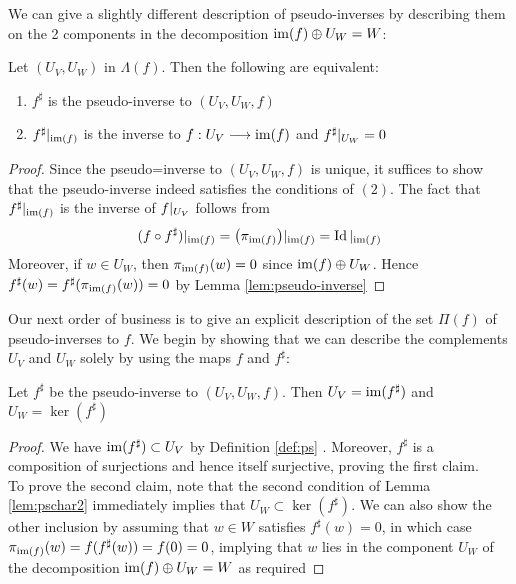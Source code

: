 We can give a slightly different description of pseudo-inverses by describing them on the 2 components in the decomposition $\operatorname{im}(f)\oplus U_W =W$:


\begin{lemma}\label{lem:pschar2}
Let $(U_V,U_W)$ in $\Lambda(f)$. Then the following are equivalent:
\begin{enumerate}
	\item $f^\sharp$ is the pseudo-inverse to $(U_V,U_W,f)$
	\item $f^\sharp\arrowvert_{\operatorname{im}(f)}$ is the inverse to $f:U_V\longrightarrow \operatorname{im}(f)$ and $f^\sharp\arrowvert_{U_W}=0$
\end{enumerate}

\end{lemma}

\begin{proof}
	Since the pseudo=inverse to $(U_V,U_W,f)$ is unique, it suffices to show that the pseudo-inverse indeed satisfies the conditions of $(2)$. The fact that $f^\sharp\arrowvert_{\operatorname{im}(f)}$ is the inverse of $f\arrowvert_{U_V}$ follows from 
	\[
	(f\circ f^\sharp) \arrowvert_{\operatorname{im}(f)}=\big(\pi_{\operatorname{im}(f)}\big)\arrowvert_{\operatorname{im}(f)}=\operatorname{Id}\arrowvert_{\operatorname{im}(f)}
\] 
Moreover, if $w \in U_W$, then $\pi_{\operatorname{im}(f)}(w)=0$ since $\operatorname{im}(f)\oplus U_W$. Hence $f^\sharp(w)=f^\sharp(\pi_{\operatorname{im}(f)}(w))=0$ by Lemma \ref{lem:pseudo-inverse}
\end{proof}
Our next order of business is to give an explicit description of the set $\Pi(f)$ of pseudo-inverses to $f$. We begin by showing that we can describe the complements $U_V$ and $U_W$ solely by using the maps $f$ and $f^\sharp$:
\begin{lemma}\label{lem:psim-ker}
	Let $f^\sharp$ be the pseudo-inverse to $(U_V,U_W,f)$. Then $U_V=\operatorname{im}(f^\sharp)$ and $U_W=\ker(f^\sharp)$
\end{lemma}

\begin{proof}
	We have $\operatorname{im}(f^\sharp)\subset U_V$ by Definition \ref{def:ps} . Moreover, $f^\sharp$ is a composition of surjections and hence itself surjective, proving the first claim.\\
	To prove the second claim, note that the second condition of Lemma \ref{lem:pschar2} immediately implies that $U_W\subset \ker(f^\sharp)$. We can also show the other inclusion by assuming that $w\in W$ satisfies $f^\sharp(w)=0$, in which case $\pi_{\operatorname{im}(f)}(w)=f(f^\sharp(w))=f(0)=0$, implying that $w$ lies in the component $U_W$ of the decomposition $\operatorname{im}(f)\oplus U_W=W$ as required
\end{proof}

